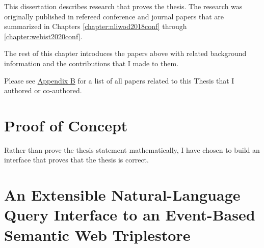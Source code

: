 \documentclass[../main.tex]{subfiles}
\begin{document}
\begin{refsection}
This dissertation describes research that proves the thesis. The research was originally published in refereed conference and journal papers that are summarized in Chapters \ref{chapter:nliwod2018conf} through \ref{chapter:webist2020conf}.

The rest of this chapter introduces the papers above with related background information and the contributions that I made to them. %

Please see \hyperref[appendix:b]{Appendix B} for a list of all papers related to this Thesis that I authored or co-authored. \cite{peelar2016accommodating}

\section{Proof of Concept}

Rather than prove the thesis statement mathematically, I have chosen to build an interface that
proves that the thesis is correct.

%


\section{An Extensible Natural-Language Query Interface to an Event-Based Semantic Web Triplestore}


\end{refsection}
\end{document}
